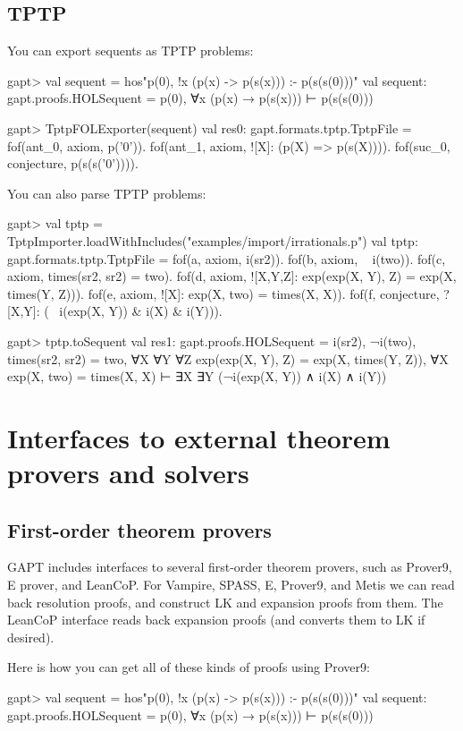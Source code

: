 \documentclass[a4paper,11pt]{book}
\begin{document}
\section{TPTP}
You can export sequents as TPTP problems:
\begin{clilisting}
  gapt> val sequent = hos"p(0), !x (p(x) -> p(s(x))) :- p(s(s(0)))"
  val sequent: gapt.proofs.HOLSequent = p(0), ∀x (p(x) → p(s(x))) ⊢ p(s(s(0)))

  gapt> TptpFOLExporter(sequent)
  val res0: gapt.formats.tptp.TptpFile = fof(ant_0, axiom, p('0')).
  fof(ant_1, axiom, ![X]: (p(X) => p(s(X)))).
  fof(suc_0, conjecture, p(s(s('0')))).

\end{clilisting}

You can also parse TPTP problems:
\begin{clilisting}
  gapt> val tptp = TptpImporter.loadWithIncludes("examples/import/irrationals.p")
  val tptp: gapt.formats.tptp.TptpFile = fof(a, axiom, i(sr2)).
  fof(b, axiom, ~ i(two)).
  fof(c, axiom, times(sr2, sr2) = two).
  fof(d, axiom, ![X,Y,Z]: exp(exp(X, Y), Z) = exp(X, times(Y, Z))).
  fof(e, axiom, ![X]: exp(X, two) = times(X, X)).
  fof(f, conjecture, ?[X,Y]: (~ i(exp(X, Y)) & i(X) & i(Y))).

  gapt> tptp.toSequent
  val res1: gapt.proofs.HOLSequent = i(sr2),
  ¬i(two),
  times(sr2, sr2) = two,
  ∀X ∀Y ∀Z exp(exp(X, Y), Z) = exp(X, times(Y, Z)),
  ∀X exp(X, two) = times(X, X)
  ⊢
  ∃X ∃Y (¬i(exp(X, Y)) ∧ i(X) ∧ i(Y))

\end{clilisting}

\chapter{Interfaces to external theorem provers and solvers}


\section{First-order theorem provers}\label{sec:fol_provers}

GAPT includes interfaces to several first-order theorem provers, such as
Prover9, E prover, and LeanCoP.  For Vampire, SPASS, E, Prover9, and Metis we can read back
resolution proofs, and construct LK and expansion proofs from them.  The
LeanCoP interface reads back expansion proofs (and converts them to LK if desired).

Here is how you can get all of these kinds of proofs using Prover9:
\begin{clilisting}
  gapt> val sequent = hos"p(0), !x (p(x) -> p(s(x))) :- p(s(s(0)))"
  val sequent: gapt.proofs.HOLSequent = p(0), ∀x (p(x) → p(s(x))) ⊢ p(s(s(0)))

\end{clilisting}
\end{document}
